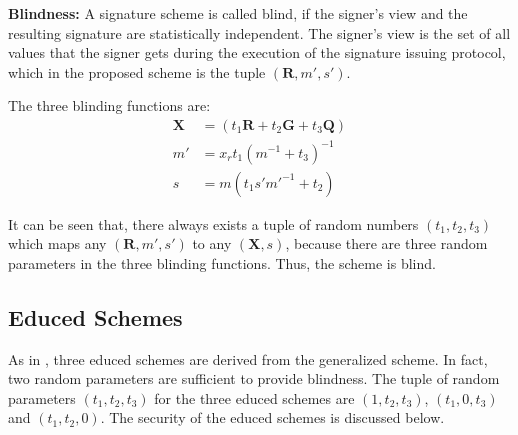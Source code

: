 \documentclass[journal,onecolumn,draftcls]{IEEEtran}
\begin{document}
\textbf{Blindness:} A signature scheme is called blind, if the signer's view and the resulting signature are statistically independent. The signer's view is the set of all values that the signer gets during the execution of the signature issuing protocol, which in the proposed scheme is the tuple $(\textbf{R},m',s')$.

The three blinding functions are:
\begin{align}
\textbf{X}  &= (t_1 \textbf{R}+t_2 \textbf{G}+t_3 \textbf{Q}) \nonumber \\
m' &= x_r t_1 (m^{-1}+t_3 )^{-1}  \nonumber \\
s &=m(t_1 s'm'^{-1}+t_2 )
\end{align}

It can be seen that, there always exists a tuple of random numbers $(t_1,t_2,t_3)$ which maps any $(\textbf{R},m',s')$ to any $(\textbf{X},s)$, because there are three random parameters in the three blinding functions. Thus, the scheme is blind.

\subsection{Educed Schemes}
As in \cite{Huang}, three educed schemes are derived from the generalized scheme. In fact, two random parameters are sufficient to provide blindness. The tuple of random parameters $(t_1,t_2,t_3)$ for the three educed schemes are $(1,t_2,t_3)$, $(t_1,0,t_3)$ and $(t_1,t_2,0)$. The security of the educed schemes is discussed below.
\end{document}

